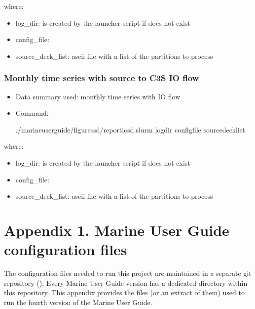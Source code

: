 \documentclass[letterpaper,10pt,english]{sphinxmanual}
\begin{document}
where:
\begin{itemize}
\item {} 
log\_dir: is created by the launcher script if does not exist

\item {} 
config\_file: {\hyperref[\detokenize{index:nreports-qc-ts-sd}]{}}

\item {} 
source\_deck\_list: ascii file with a list of the  partitions to process

\end{itemize}


\subsection{Monthly time series with source to C3S IO flow}
\label{\detokenize{index:id8}}\begin{itemize}
\item {} 
Data summary used: monthly time series with IO flow

\item {} 
Command:

\begin{sphinxVerbatim}[commandchars=\\\{\}]
./marine\PYGZhy{}user\PYGZhy{}guide/figures\PYGZus{}sd/report\PYGZus{}io\PYGZus{}sd.slurm log\PYGZus{}dir config\PYGZus{}file source\PYGZus{}deck\PYGZus{}list
\end{sphinxVerbatim}

\end{itemize}

where:
\begin{itemize}
\item {} 
log\_dir: is created by the launcher script if does not exist

\item {} 
config\_file: {\hyperref[\detokenize{index:report-io-plot-sd}]{}}

\item {} 
source\_deck\_list: ascii file with a list of the  partitions to process

\end{itemize}


\chapter{Appendix 1. Marine User Guide configuration files}
\label{\detokenize{index:appendix-1-marine-user-guide-configuration-files}}\label{\detokenize{index:appendix}}
The configuration files needed to run this project are maintained in a separate
git repository (). Every
Marine User Guide version has a dedicated directory within this repository. This
appendix provides the files (or an extract of them) used to run the fourth
version of the Marine User Guide.
\end{document}
